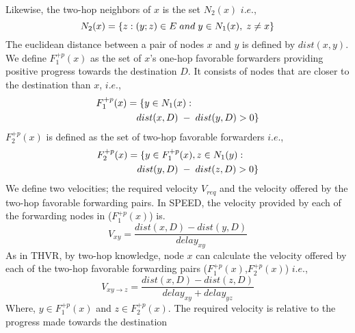\documentclass[fleqn,twoside]{article}
\begin{document}
Likewise, the two-hop neighbors of $x$ is the set $N_2(x)$ $i.e.$,
\begin{equation}
N_2(x) = \{z:(y;z) \in E \hspace{0.1cm} and \hspace{0.1cm} y \in N_1(x), \hspace{0.1cm} z \neq x\}
\label{eqn:Eq5}
\end{equation}
The euclidean distance between a pair of nodes $x$ and $y$ is defined by $dist(x,y)$. We define $F_{1}^{+p}(x)$ as the set of $x$'s one-hop favorable forwarders providing positive progress towards the destination $D$. It consists of nodes that are closer to the destination than $x$, $i.e.$,
\begin{equation}
\begin{split}
F_1^{+p}(x)& = \{y \in N_1(x): \\ 
	   & \quad dist(x,D) \hspace{0.1cm} - \hspace{0.1cm} dist(y,D) > 0\}
\label{eqn:Eq6}
\end{split}
\end{equation}
$F_{2}^{+p}(x)$ is defined as the set of two-hop favorable forwarders $i.e.$,
\begin{equation}
\begin{split}
F_2^{+p}(x)& = \{y\in F_1^{+p}(x),z\in N_1(y):\hspace{0.1cm} \\
           & \quad dist(y,D)\hspace{0.1cm}-\hspace{0.1cm} dist(z,D)>0\}
\label{eqn:Eq7}
\end{split}
\end{equation}
We define two velocities; the required velocity $V_{req}$ and the velocity offered by the two-hop favorable forwarding pairs. In SPEED, 
the velocity provided by each of the forwarding nodes in ($F_1^{+p}(x)$) is.
\begin{equation}
V_{xy} = \frac{dist(x,D) - dist(y,D)}{delay_{xy}}
\label{eqn:Eq8}
\end{equation}
As in THVR, by two-hop knowledge, node $x$ can calculate the velocity offered by each of the two-hop favorable forwarding pairs ($F_1^{+p}(x)$,$F_2^{+p}(x)$) $i.e.$,
\begin{equation}
V_{xy\rightarrow z} = \frac{dist(x,D) - dist(z,D)}{delay_{xy} + delay_{yz}}
\label{eqn:Eq9}
\end{equation}
Where, $y \in F_1^{+p}(x)$ and $z \in F_2^{+p}(x)$. The required velocity is relative to the progress made towards the destination
\end{document}
